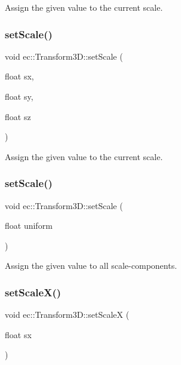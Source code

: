 Assign the given value to the current scale. \mbox{\label{classec_1_1_transform3_d_a604f8cab4d669b713e04b57a7cc57c0c}} 
\subsubsection{\texorpdfstring{set\+Scale()}{setScale()}\hspace{0.1cm}{\footnotesize\ttfamily [2/3]}}
{\footnotesize\ttfamily void ec\+::\+Transform3\+D\+::set\+Scale (\begin{DoxyParamCaption}\item[{float}]{sx,  }\item[{float}]{sy,  }\item[{float}]{sz }\end{DoxyParamCaption})}

Assign the given value to the current scale. \mbox{\label{classec_1_1_transform3_d_a2bdde49d328296d1a77586ee00f4bf4e}} 
\subsubsection{\texorpdfstring{set\+Scale()}{setScale()}\hspace{0.1cm}{\footnotesize\ttfamily [3/3]}}
{\footnotesize\ttfamily void ec\+::\+Transform3\+D\+::set\+Scale (\begin{DoxyParamCaption}\item[{float}]{uniform }\end{DoxyParamCaption})}

Assign the given value to all scale-\/components. \mbox{\label{classec_1_1_transform3_d_ada2c6aded239ad20e1c155a5dee60506}} 
\subsubsection{\texorpdfstring{set\+Scale\+X()}{setScaleX()}}
{\footnotesize\ttfamily void ec\+::\+Transform3\+D\+::set\+ScaleX (\begin{DoxyParamCaption}\item[{float}]{sx }\end{DoxyParamCaption})}

